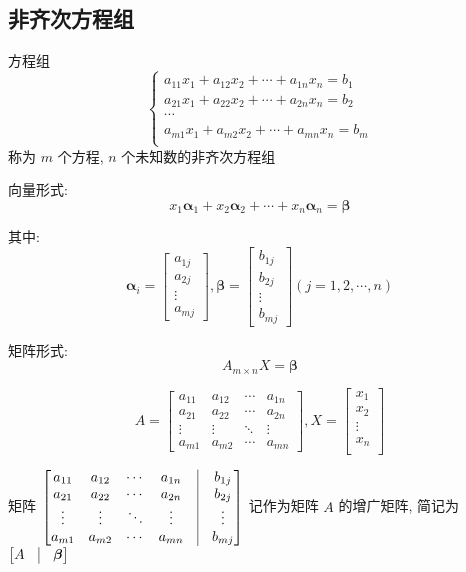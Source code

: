 \subsection{非齐次方程组}
\begin{definition}[非齐次方程组]
	方程组
	$$\begin{cases}
		a_{11}x_{1}+a_{12}x_{2}+\cdots+a_{1n}x_{n}=b_{1}\\
		a_{21}x_{1}+a_{22}x_{2}+\cdots+a_{2n}x_{n}=b_{2}\\
		\cdots\\
		a_{m1}x_{1}+a_{m2}x_{2}+\cdots+a_{mn}x_{n}=b_{m}\\
	\end{cases}$$
	称为 $m$ 个方程, $n$ 个未知数的非齐次方程组
	
	向量形式:
	$$x_{1}\boldsymbol{\alpha}_{1} + x_{2}\boldsymbol{\alpha}_{2} + \cdots + x_{n}\boldsymbol{\alpha}_{n} = \boldsymbol{\beta}$$

	其中:  
	$$\boldsymbol{\alpha}_{i} = 
	\begin{bmatrix}
		a_{1j}\\
		a_{2j}\\
		\vdots\\
		a_{mj}
	\end{bmatrix}, 
	\boldsymbol{\beta} = 
	\begin{bmatrix}
		b_{1j}\\
		b_{2j}\\
		\vdots\\
		b_{mj}
	\end{bmatrix}(j=1,2,\cdots,n)$$
	
	矩阵形式:  
	$$A_{m\times n}X = \boldsymbol{\beta}$$
	
	$$A = 
	\begin{bmatrix}
		a_{11} & a_{12} & \cdots & a_{1n}\\
		a_{21} & a_{22} & \cdots & a_{2n}\\
		\vdots & \vdots & \ddots & \vdots\\
		a_{m1} & a_{m2} & \cdots & a_{mn}
	\end{bmatrix}, 
	X = 
	\begin{bmatrix}
		x_{1}\\
		x_{2}\\
		\vdots\\
		x_{n}\\
	\end{bmatrix}$$

	矩阵 $\begin{bmatrix}
		a_{11} & a_{12} & \cdots & a_{1n} & \vline & b_{1j} \\
		a_{21} & a_{22} & \cdots & a_{2n} & \vline & b_{2j} \\
		\vdots & \vdots & \ddots & \vdots & \vline & \vdots \\
		a_{m1} & a_{m2} & \cdots & a_{mn} & \vline & b_{mj} \\
		\end{bmatrix}$ 记作为矩阵 $A$ 的增广矩阵, 简记为 $\begin{bmatrix} A & \vline & \boldsymbol{\beta}\end{bmatrix}$
\end{definition}

